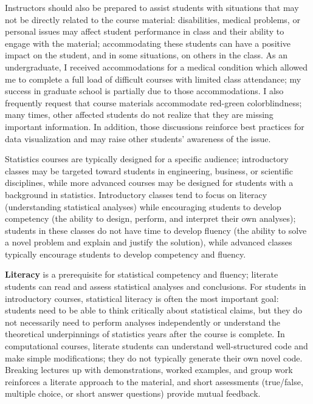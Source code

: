\documentclass[11pt,letterpaper,sans,unicode]{moderncv}        %
\begin{document}
Instructors should also be prepared to assist students with situations that may not be directly related to the course material: disabilities, medical problems, or personal issues may affect student performance in class and their ability to engage with the material; accommodating these students can have a positive impact on the student, and in some situations, on others in the class. As an undergraduate, I received accommodations for a medical condition which allowed me to complete a full load of difficult courses with limited class attendance; my success in graduate school is partially due to those accommodations. I also frequently request that course materials accommodate red-green colorblindness; many times, other affected students do not realize that they are missing important information. In addition, those discussions reinforce best practices for data visualization and may raise other students' awareness of the issue. 

\vspace{.65cm}\hspace{8pt}
Statistics courses are typically designed for a specific audience; introductory classes may be targeted toward students in engineering, business, or scientific disciplines, while more advanced courses may be designed for students with a background in statistics. Introductory classes tend to focus on literacy (understanding statistical analyses) while encouraging students to develop competency (the ability to design, perform, and interpret their own analyses); students in these classes do not have time to develop fluency (the ability to solve a novel problem and explain and justify the solution), while advanced classes typically encourage students to develop competency and fluency.

\textbf{Literacy} is a prerequisite for statistical competency and fluency; literate students can read and assess statistical analyses and conclusions. For students in introductory courses, statistical literacy is often the most important goal: students need to be able to think critically about statistical claims, but they do not necessarily need to perform analyses independently or understand the theoretical underpinnings of statistics years after the course is complete. In computational courses, literate students can understand well-structured code and make simple modifications; they do not typically generate their own novel code. Breaking lectures up with demonstrations, worked examples, and group work reinforces a literate approach to the material, and short assessments (true/false, multiple choice, or short answer questions) provide mutual feedback. 
\end{document}
